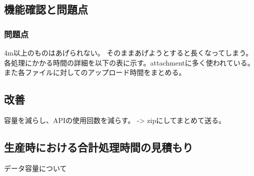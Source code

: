 \subsection{機能確認と問題点}
\subsubsection{問題点}
4m以上のものはあげられない。
そのままあげようとすると長くなってしまう。
各処理にかかる時間の詳細を以下の表に示す。attachmentに多く使われている。
また各ファイルに対してのアップロード時間をまとめる。

\subsection{改善}
容量を減らし、APIの使用回数を減らす。 -> zipにしてまとめて送る。

\subsection{生産時における合計処理時間の見積もり}
データ容量について

